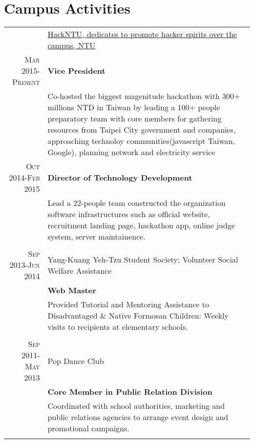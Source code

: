 \documentclass[a4paper,11pt]{article} %
\begin{document}
\section{Campus Activities}
\begin{tabular}{r|p{11cm}}

& \href{https://hackntu.org}{HackNTU, dedicates to promote hacker spirits over the campus, NTU}\\
\textsc{Mar 2015-Present}& \normalsize\textbf{Vice President}\\
&\footnotesize{Co-hosted the biggest magenitude hackathon with 300+ millions NTD in Taiwan by leading a 100+ people preparatory team with core members for gathering resources from Taipei City government and companies, approaching technoloy communities(javascript Taiwan, Google), planning network and electricity service}\\
\newline \newline

\textsc{Oct 2014-Feb 2015}& \normalsize\textbf{Director of Technology Development}\\
&\footnotesize{Lead a 22-people team constructed the organization software infrastructures such as official website, recruitment landing page, hackathon app, online judge system, server maintainence.}\\
\multicolumn{2}{c}{} \\

\textsc{Sep 2013-Jun 2014}& Yang-Kuang Yeh-Tzu Student Society; Volunteer Social Welfare Assistance \\
& \normalsize\textbf{Web Master}\\
& \footnotesize{Provided Tutorial and Mentoring Assistance to Disadvantaged \& Native Formosan Children: Weekly visits to recipients at elementary schools.}\\
\multicolumn{2}{c}{} \\

\textsc{Sep 2011-May 2013}& Pop Dance Club\\
&\normalsize\textbf{Core Member in Public Relation Division}\\
&\footnotesize{Coordinated with school authorities, marketing and public relations agencies to arrange event
design and promotional campaigns.}\\
\multicolumn{2}{c}{} \\

\end{tabular}
\end{document}
